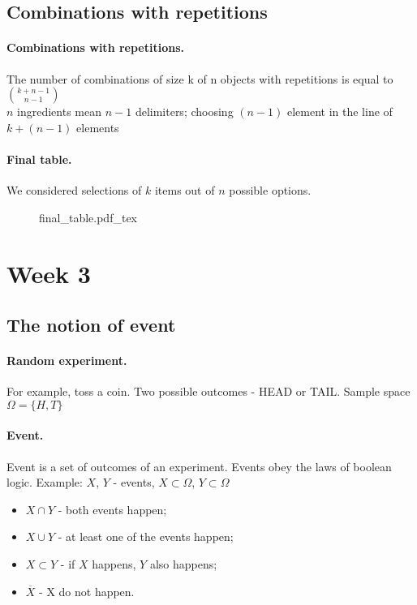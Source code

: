 \documentclass{article}
\newcommand{\incfig}[2][1]{%
    \def\svgwidth{#1\columnwidth}
    {#2.pdf_tex}
}
\begin{document}
\subsection{Combinations with repetitions}

\paragraph{Combinations with repetitions.}
The number of combinations of size k of n objects with repetitions is equal to ${k+n-1} \choose {n-1}$
\\
$n$ ingredients mean $n-1$ delimiters; choosing $(n-1)$ element in the line of $k+(n-1)$ elements

\paragraph{Final table.}
We considered selections of $k$ items out of $n$ possible options.
\begin{figure}[h!]
  \centering
  \incfig{final_table}
\end{figure}

\section{Week 3}

\subsection{The notion of event}

\paragraph{Random experiment.}
For example, toss a coin. Two possible outcomes - HEAD or TAIL. Sample space $\Omega = \{H, T\}$

\paragraph{Event.}
Event is a set of outcomes of an experiment. Events obey the laws of boolean logic. Example: $X$, $Y$ - events, $X \subset \Omega$, $Y \subset \Omega$
\begin{itemize}
  \item $X \cap Y$ - both events happen;
  \item $X \cup Y$ - at least one of the events happen;
  \item $X \subset Y$ - if $X$ happens, $Y$ also happens;
  \item $\overline X$ - X do not happen.
\end{itemize}
\end{document}
